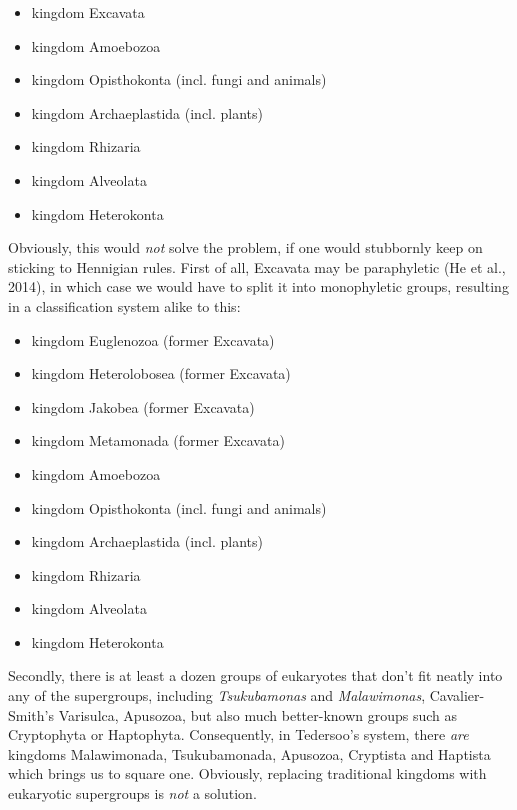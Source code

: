 \documentclass[a4paper]{article}
\begin{document}
\begin{itemize}
\item kingdom Excavata
\item kingdom Amoebozoa
\item kingdom Opisthokonta (incl. fungi and animals)
\item kingdom Archaeplastida (incl. plants)
\item kingdom Rhizaria
\item kingdom Alveolata
\item kingdom Heterokonta
\end{itemize}
Obviously, this would \textit{not} solve the problem, if one would stubbornly keep on sticking to Hennigian rules. First
of all, Excavata may be paraphyletic \label{ref:RNDd85mwMFAal}(He et al., 2014), in which case we would have to split
it into monophyletic groups, resulting in a classification system alike to this:

\begin{itemize}
\item kingdom Euglenozoa (former Excavata)
\item kingdom Heterolobosea (former Excavata)
\item kingdom Jakobea (former Excavata)
\item kingdom Metamonada (former Excavata)
\item kingdom Amoebozoa
\item kingdom Opisthokonta (incl. fungi and animals)
\item kingdom Archaeplastida (incl. plants)
\item kingdom Rhizaria
\item kingdom Alveolata
\item kingdom Heterokonta
\end{itemize}
Secondly, there is at least a dozen groups of eukaryotes that don’t fit neatly into any of the supergroups, including
\textit{Tsukubamonas} and \textit{Malawimonas}, Cavalier-Smith’s Varisulca, Apusozoa, but also much better-known groups
such as Cryptophyta or Haptophyta. Consequently, in Tedersoo’s system, there \textit{are} kingdoms Malawimonada,
Tsukubamonada, Apusozoa, Cryptista and Haptista which brings us to square one. Obviously, replacing traditional
kingdoms with eukaryotic supergroups is \textit{not }a solution.
\end{document}
